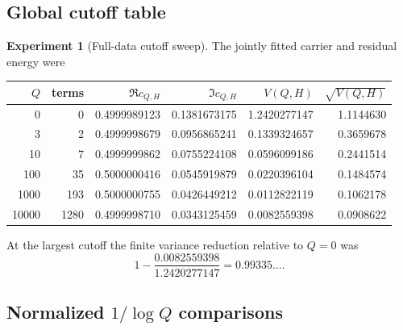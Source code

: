 \documentclass[11pt]{amsart}
\numberwithin{equation}{section}
\theoremstyle{plain}
\theoremstyle{definition}
\newtheorem{experiment}[theorem]{Experiment}
\theoremstyle{remark}
\newcommand{\1}{\mathbf{1}}
\begin{document}
\subsection{Global cutoff table}
\label{subsec:numerical_global_cutoff_table}

\begin{experiment}[Full-data cutoff sweep]
\label{exp:full_data_sweep}
The jointly fitted carrier and residual energy were
\begin{center}
\begin{tabular}{rrrrrr}
\toprule
$Q$ & terms & $\Re c_{Q,H}$ & $\Im c_{Q,H}$ & $V(Q,H)$ & $\sqrt{V(Q,H)}$\\
\midrule
0 & 0 & 0.4999989123 & 0.1381673175 & 1.2420277147 & 1.1144630\\
3 & 2 & 0.4999998679 & 0.0956865241 & 0.1339324657 & 0.3659678\\
10 & 7 & 0.4999999862 & 0.0755224108 & 0.0596099186 & 0.2441514\\
100 & 35 & 0.5000000416 & 0.0545919879 & 0.0220396104 & 0.1484574\\
1000 & 193 & 0.5000000755 & 0.0426449212 & 0.0112822119 & 0.1062178\\
10000 & 1280 & 0.4999998710 & 0.0343125459 & 0.0082559398 & 0.0908622\\
\bottomrule
\end{tabular}
\end{center}
At the largest cutoff the finite variance reduction relative to $Q=0$ was
\begin{equation}
1-\frac{0.0082559398}{1.2420277147}
=0.99335\ldots.
\label{eq:numerical_variance_reduction_detailed}
\end{equation}
\end{experiment}

\subsection{Normalized $1/\log Q$ comparisons}
\label{subsec:numerical_normalized_scaling}
\end{document}
